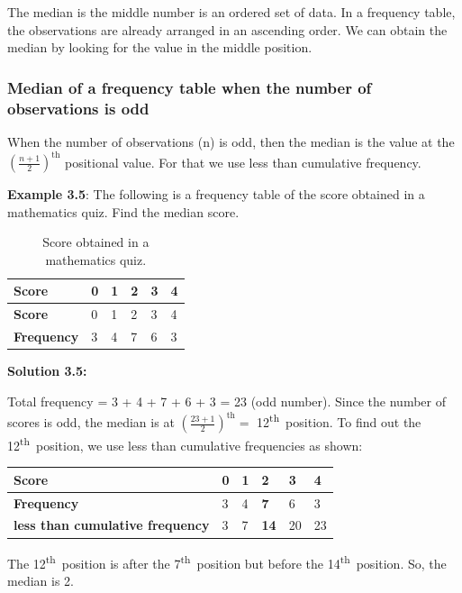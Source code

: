 \documentclass[
]{book}
\begin{document}
The median is the middle number is an ordered set of data. In a
frequency table, the observations are already arranged in an ascending
order. We can obtain the median by looking for the value in the middle
position.

\subsubsection{Median of a frequency table when the number of observations is odd}\label{median-of-a-frequency-table-when-the-number-of-observations-is-odd}

When the number of observations (n) is odd, then the median is the value
at the~\(\left( \frac{n + 1}{2} \right)^{\text{th}}\) positional value.
For that we use less than cumulative frequency.

\textbf{Example 3.5}: The following is a frequency table of the score
obtained in a mathematics quiz. Find the median score.

\begin{longtable}[]{@{}llllll@{}}
\caption{\label{tab:score} Score obtained in a mathematics quiz.}\tabularnewline
\toprule\noalign{}
\textbf{Score} & 0 & 1 & 2 & 3 & 4 \\
\midrule\noalign{}
\endfirsthead
\toprule\noalign{}
\textbf{Score} & 0 & 1 & 2 & 3 & 4 \\
\midrule\noalign{}
\endhead
\bottomrule\noalign{}
\endlastfoot
\textbf{Frequency} & 3 & 4 & 7 & 6 & 3 \\
\end{longtable}

\textbf{Solution 3.5:}

Total frequency = 3 + 4 + 7 + 6 + 3 = 23 (odd number). Since the number
of scores is odd, the median is at
\(\left( \frac{23 + 1}{2} \right)^{\text{th}} =\) 12\textsuperscript{th}~position. To find
out the 12\textsuperscript{th}~position, we use less than cumulative frequencies as
shown:

\begin{longtable}[]{@{}llllll@{}}
\toprule\noalign{}
\textbf{Score} & 0 & 1 & \textbf{2} & 3 & 4 \\
\midrule\noalign{}
\endhead
\bottomrule\noalign{}
\endlastfoot
\textbf{Frequency} & 3 & 4 & \textbf{7} & 6 & 3 \\
\textbf{less than cumulative frequency} & 3 & 7 & \textbf{14} & 20 & 23 \\
\end{longtable}

The 12\textsuperscript{th}~position is after the 7\textsuperscript{th}~position but before the
14\textsuperscript{th}~position. So, the median is 2.
\end{document}
